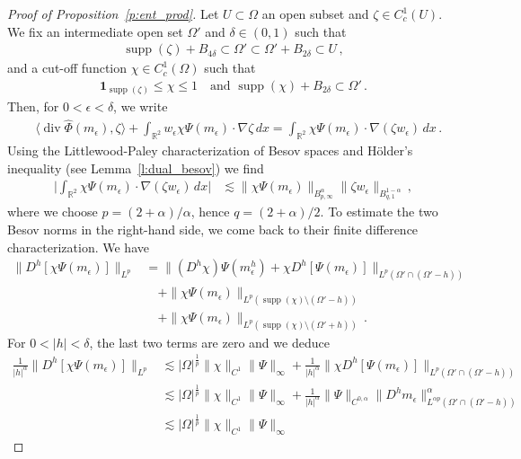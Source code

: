 \documentclass[fleqn
]{article}
\numberwithin{equation}{section}
\newcommand{\R}{{\mathbb R}}
\newcommand{\e}{\epsilon}
\DeclareMathOperator{\dv}{div}
\DeclareMathOperator{\supp}{supp}
\theoremstyle{definition}
\begin{document}
\begin{proof}[Proof of Proposition~\ref{p:ent_prod}]
Let $U\subset\Omega$ an open subset and $\zeta\in C_c^1(U)$.
We fix an intermediate open set $\Omega'$ and $\delta\in (0,1)$ such that
\begin{align*}
\supp(\zeta) +B_{4\delta}\subset\Omega'
\subset\Omega'+B_{2\delta}\subset U\,,
\end{align*}
and a cut-off function  $\chi\in C_c^1(\Omega)$ such that
\begin{align*}
\mathbf 1_{\supp(\zeta)}\leq \chi\leq 1
\quad
\text{and } \supp(\chi)+B_{2\delta}\subset\Omega'\,.
\end{align*}
%
Then, for $0<\e<\delta$, we write
\begin{align}\label{eq:dvPhimeps_chi}
&
\langle\dv \widehat\Phi(m_\e),\zeta\rangle
+
\int_{\R^2}w_\e \chi\Psi(m_\e)\cdot\nabla\zeta \, dx
=\int_{\R^2}\chi\Psi(m_\e)\cdot\nabla(\zeta w_\e ) \, dx
\,.
\end{align}
Using the Littlewood-Paley characterization of Besov spaces and Hölder's inequality (see Lemma~\ref{l:dual_besov})  we find 
\begin{align}
\label{eq:estim_LP}
\bigg|
\int_{\R^2}\chi\Psi(m_\e)\cdot\nabla(\zeta w_\e) \, dx
\bigg|
&
\lesssim
\|\chi\Psi(m_\e)\|_{B^{\alpha}_{p,\infty}}  \|\zeta w_\e\|_{B^{1-\alpha}_{q,1}}\,,
\end{align}
where we choose $p=(2+\alpha)/\alpha$, hence $q=(2+\alpha)/2$.
To estimate the two Besov norms in the right-hand side,
 we come back to their finite difference characterization.
We have
\begin{align*}
\|D^h[\chi \Psi(m_\e)]\|_{L^p}
&
=\|(D^h\chi) \Psi(m_\e^h) +\chi D^h [\Psi(m_\e)]\|_{L^p(\Omega' \cap (\Omega'-h))}
\\
&
\quad
+\|\chi \Psi(m_\e)\|_{L^p(\supp(\chi)\setminus (\Omega'-h))}
\\
&
\quad
+\|\chi  \Psi(m_\e) \|_{L^p( \supp(\chi)\setminus(\Omega'+h))}\,.
\end{align*}
For $0<|h|<\delta$, the last two terms are zero and we deduce
\begin{align*}
\frac{1}{|h|^\alpha}
\|D^h[\chi \Psi(m_\e)]\|_{L^p}
&
\lesssim |\Omega|^{\frac 1p}\|\chi\|_{C^1}
\|\Psi\|_\infty
+\frac{1}{|h|^\alpha}\|\chi D^h [\Psi(m_\e)]\|_{L^p(\Omega' \cap (\Omega'-h))}
\\
&
\lesssim |\Omega|^{\frac 1p} \|\chi\|_{C^1}\|\Psi\|_\infty
+\frac{1}{|h|^\alpha}\|\Psi\|_{C^{0,\alpha}}
\| D^h m_\e \|^\alpha_{L^{\alpha p}(\Omega' \cap (\Omega'-h))}
\\
&
\lesssim 
|\Omega|^{\frac 1p} \|\chi\|_{C^1}\|\Psi\|_\infty

\end{align*}
\end{proof}
\end{document}
